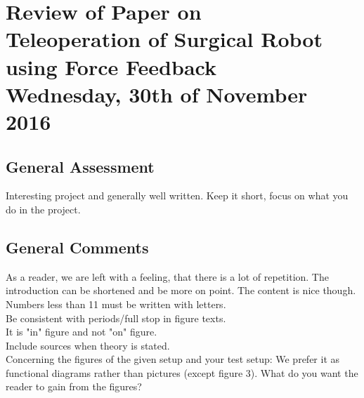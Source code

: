 
\usepackage{enumitem}
\renewcommand{\vec}[1]{\boldsymbol{\mathbf{#1}}}

\renewcommand\chaptername{KAPITEL}
\renewcommand\contentsname{Indhold}
\renewcommand\figurename{Figur}
\renewcommand\tablename{Tabel}

\section*{Review of Paper on\\
Teleoperation of Surgical Robot using Force Feedback\\
\small Wednesday, 30th of November 2016}
\subsection{General Assessment}
Interesting project and generally well written. Keep it short, focus on what you do in the project.

\subsection{General Comments}
As a reader, we are left with a feeling, that there is a lot of repetition. The introduction can be shortened and be more on point. The content is nice though.\\

\vspace{-7pt}\noindent
Numbers less than 11 must be written with letters.\\

\vspace{-7pt}\noindent
Be consistent with periods/full stop in figure texts.\\

\vspace{-7pt}\noindent
It is "in" figure and not "on" figure.\\

\vspace{-7pt}\noindent
Include sources when theory is stated.\\

\vspace{-7pt}\noindent
Concerning the figures of the given setup and your test setup: We prefer it as functional diagrams rather than pictures (except figure 3). What do you want the reader to gain from the figures?\\

